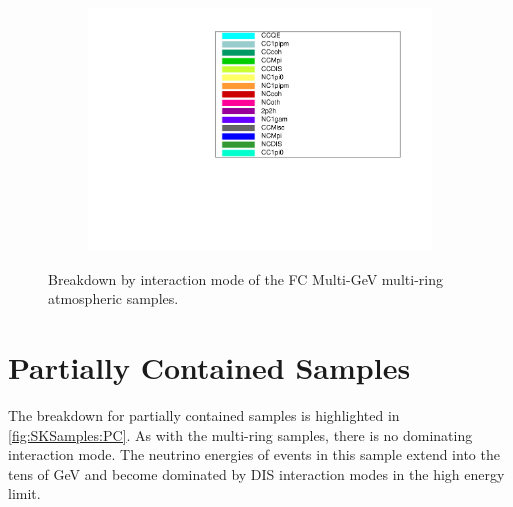 \begin{figure}[ht]
\begin{subfigure}[t]{0.49\textwidth}
      \includegraphics[page=1,width=\textwidth, trim= 0 0 0 30, clip]{Figures/Selections/AtmosphericByMode/Legend.pdf}
    \end{subfigure}
    
    \caption{Breakdown by interaction mode of the FC Multi-GeV  multi-ring atmospheric samples.}
    \label{fig:SKSamples:FCMultiRing}
\end{figure}

\clearpage
\section{Partially Contained Samples}
The breakdown for partially contained samples is highlighted in \autoref{fig:SKSamples:PC}. As with the multi-ring samples, there is no dominating interaction mode. The neutrino energies of events in this sample extend into the tens of GeV and become dominated by DIS interaction modes in the high energy limit.

